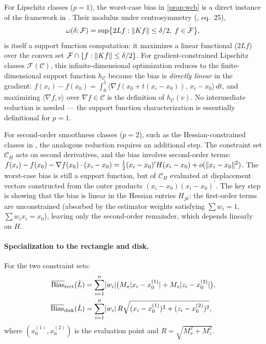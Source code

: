 \begin{remark}\label{rem:ak_support_function}
	For Lipschitz classes ($p = 1$), the worst-case bias in \cref{prop:wcb} is a direct instance of the framework in \textcite{armstrong_optimal_2018}.
	Their modulus under centrosymmetry (\citeyear{armstrong_optimal_2018}, eq.~25),
	\[
		\omega(\delta; \mathcal{F}) = \sup\bigl\{ 2Lf : \lVert Kf\rVert \leq \delta/2,\; f \in \mathcal{F} \bigr\},
	\]
	is itself a support function computation: it maximizes a linear functional ($2Lf$) over the convex set $\mathcal{F} \cap \{f : \lVert Kf\rVert \leq \delta/2\}$.
	For gradient-constrained Lipschitz classes $\mathcal{F}(\mathcal{C})$, this infinite-dimensional optimization reduces to the finite-dimensional support function $h_{\mathcal{C}}$ because the bias is \emph{directly linear} in the gradient:
	$f(x_i) - f(x_0) = \int_0^1 \langle \nabla f(x_0 + t(x_i - x_0)),\, x_i - x_0 \rangle \, dt$,
	and maximizing $\langle \nabla f, v \rangle$ over $\nabla f \in \mathcal{C}$ is the definition of $h_{\mathcal{C}}(v)$.
	No intermediate reduction is needed --- the support function characterization is essentially definitional for $p = 1$.

	For second-order smoothness classes ($p = 2$), such as the Hessian-constrained classes in \textcite{imbens_optimized_2019}, the analogous reduction requires an additional step.
	The constraint set $\mathcal{C}_H$ acts on second derivatives, and the bias involves second-order terms:
	$f(x_i) - f(x_0) - \nabla f(x_0) \cdot (x_i - x_0) = \tfrac{1}{2}(x_i - x_0)^\prime H (x_i - x_0) + o(\lVert x_i - x_0\rVert^2)$.
	The worst-case bias is still a support function, but of $\mathcal{C}_H$ evaluated at displacement vectors constructed from the outer products $(x_i - x_0)(x_i - x_0)^\prime$.
	The key step is showing that the bias is linear in the Hessian entries $H_{jk}$: the first-order terms are unconstrained (absorbed by the estimator weights satisfying $\sum w_i = 1$, $\sum w_i x_i = x_0$), leaving only the second-order remainder, which depends linearly on $H$.
\end{remark}

\paragraph{Specialization to the rectangle and disk.}
For the two constraint sets:
\begin{align}
	\overline{\mathrm{Bias}}_{\mathrm{rect}}(\hat{L}) &= \sum_{i=1}^n \lvert w_i\rvert \bigl( M_x \lvert x_i - x_0^{(1)}\rvert + M_z \lvert z_i - x_0^{(2)}\rvert \bigr), \label{eq:wcb_rect} \\
	\overline{\mathrm{Bias}}_{\mathrm{disk}}(\hat{L}) &= \sum_{i=1}^n \lvert w_i\rvert \, R \sqrt{(x_i - x_0^{(1)})^2 + (z_i - x_0^{(2)})^2}, \label{eq:wcb_disk}
\end{align}
where $(x_0^{(1)}, x_0^{(2)})$ is the evaluation point and $R = \sqrt{M_x^2 + M_z^2}$.

